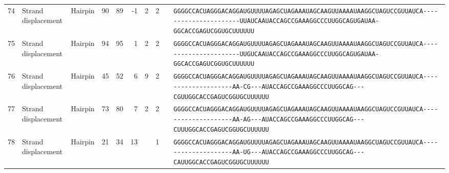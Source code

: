 \begin{tabular}{rllrrrrrcl}
 74 & Strand displacement & Hairpin & 90 & 89 & -1 & 2 & 2 &  &
 \color{ucsfdarkgrey}\verb|GGGGCCACUAGGGACAGGAU|\color{ucsforange}\verb|GUUUUA|\color{ucsfblue}\verb|GAGCUAGAAAUAGCAAGU|\color{ucsforange}\verb|UAAAAUAA|\color{ucsfnavy}\verb|GGCUAGUCCGU|\color{ucsforange}\verb|UAUCA|\color{ucsfteal}\verb|----------------------UUAUCA|\color{ucsfpurple}\verb|AUACCAGCCGAAAGGCCCUUGGCAG|\color{ucsfteal}\verb|UGAUAA-|\color{ucsforange}\verb|GGCACCGAGUCGGUGCUUUUUU| \\

 75 & Strand displacement & Hairpin & 94 & 95 & 1 & 2 & 2 &  &
 \color{ucsfdarkgrey}\verb|GGGGCCACUAGGGACAGGAU|\color{ucsforange}\verb|GUUUUA|\color{ucsfblue}\verb|GAGCUAGAAAUAGCAAGU|\color{ucsforange}\verb|UAAAAUAA|\color{ucsfnavy}\verb|GGCUAGUCCGU|\color{ucsforange}\verb|UAUCA|\color{ucsfteal}\verb|----------------------UUGUCA|\color{ucsfpurple}\verb|AUACCAGCCGAAAGGCCCUUGGCAG|\color{ucsfteal}\verb|UGAUAA-|\color{ucsforange}\verb|GGCACCGAGUCGGUGCUUUUUU| \\

 76 & Strand displacement & Hairpin & 45 & 52 & 6 & 9 & 2 &  &
 \color{ucsfdarkgrey}\verb|GGGGCCACUAGGGACAGGAU|\color{ucsforange}\verb|GUUUUA|\color{ucsfblue}\verb|GAGCUAGAAAUAGCAAGU|\color{ucsforange}\verb|UAAAAUAA|\color{ucsfnavy}\verb|GGCUAGUCCGU|\color{ucsforange}\verb|UAUCA|\color{ucsfteal}\verb|--------------------AA-CG---|\color{ucsfpurple}\verb|AUACCAGCCGAAAGGCCCUUGGCAG|\color{ucsfteal}\verb|---CGUU|\color{ucsforange}\verb|GGCACCGAGUCGGUGCUUUUUU| \\

 77 & Strand displacement & Hairpin & 73 & 80 & 7 & 2 & 2 &  &
 \color{ucsfdarkgrey}\verb|GGGGCCACUAGGGACAGGAU|\color{ucsforange}\verb|GUUUUA|\color{ucsfblue}\verb|GAGCUAGAAAUAGCAAGU|\color{ucsforange}\verb|UAAAAUAA|\color{ucsfnavy}\verb|GGCUAGUCCGU|\color{ucsforange}\verb|UAUCA|\color{ucsfteal}\verb|--------------------AA-AG---|\color{ucsfpurple}\verb|AUACCAGCCGAAAGGCCCUUGGCAG|\color{ucsfteal}\verb|---CUUU|\color{ucsforange}\verb|GGCACCGAGUCGGUGCUUUUUU| \\

 78 & Strand displacement & Hairpin & 21 & 34 & 13 &  & 1 &  &
 \color{ucsfdarkgrey}\verb|GGGGCCACUAGGGACAGGAU|\color{ucsforange}\verb|GUUUUA|\color{ucsfblue}\verb|GAGCUAGAAAUAGCAAGU|\color{ucsforange}\verb|UAAAAUAA|\color{ucsfnavy}\verb|GGCUAGUCCGU|\color{ucsforange}\verb|UAUCA|\color{ucsfteal}\verb|--------------------AA-UG---|\color{ucsfpurple}\verb|AUACCAGCCGAAAGGCCCUUGGCAG|\color{ucsfteal}\verb|---CAUU|\color{ucsforange}\verb|GGCACCGAGUCGGUGCUUUUUU| \\


\end{tabular}
